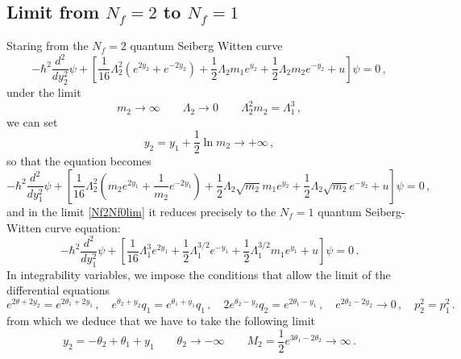 \documentclass[11pt,a4paper]{elsarticle}
\def \th {\theta}
\newcommand{\be}{\begin{equation}}
\newcommand{\ee}{\end{equation}}
\def\th{\theta}
\numberwithin{figure}{section}
\numberwithin{table}{section}
\begin{document}
\subsection{Limit from $N_f=2$ to $N_f=1$}

Staring from the $N_f=2$ quantum Seiberg Witten curve
\be 
-\hbar^2  \frac{d^2}{d y_2^2} \psi + \left[\frac{1}{16} \Lambda_2^2 (e^{2y_2} +e^{-2y_2} ) + \frac{1}{2}\Lambda_2 m_1 e^{y_2} + \frac{1}{2}\Lambda_2 m_2 e^{-y_2} +u\right] \psi = 0\,,
\ee
under the limit
\be  \label{Nf2Nf0lim}
m_2 \to \infty \qquad \Lambda_2 \to 0 \qquad\Lambda_2^2 m_2 = \Lambda_1^3  \,,
\ee
we can set
\be 
y_2 = y_1+\frac{1}{2} \ln m_2 \to + \infty\,,
\ee
so that the equation becomes
 \be 
-\hbar^2  \frac{d^2}{d y_1^2} \psi + \left[\frac{1}{16} \Lambda_2^2\left ( m_2 e^{2y_1} +\frac{1}{m_2}e^{-2y_1} \right) + \frac{1}{2}\Lambda_2 \sqrt{m_2}m_1  e^{y_2} + \frac{1}{2}\Lambda_2 \sqrt{m_2} e^{-y_2} +u\right] \psi = 0\,,
\ee
and in the limit \eqref{Nf2Nf0lim} it reduces precisely to the $N_f=1$ quantum Seiberg-Witten curve equation:
\be 
-\hbar^2  \frac{d^2}{d y_1^2} \psi + \left[\frac{1}{16} \Lambda_1^3 e^{2y_1} +\frac{1}{2}\Lambda_1^{3/2}e^{-y_1}  +\frac{1}{2} \Lambda_1^{3/2} m_1 e^{y_1} +u\right] \psi = 0 \,.
\ee
In integrability variables, we impose the conditions that allow the limit of the differential equations
\be 
e^{2 \th+2y_2} = e^{2 \th_1+2 y_1} \,, \quad e^{\th_2+y_2} q_1= e^{\th_1+ y_1} q_1\,,\quad
2e^{\th_2-y_2} q_2 = e^{2 \th_1-y_1} \,,\quad e^{2 \th_2 - 2 y_2} \to 0\,,\quad p_2^2 = p_1^2\,.
\ee 
from which we deduce that we have to take the following limit
\be 
y_2 = - \th_2 + \th_1 + y_1 \qquad \th_2 \to - \infty \qquad M_2 = \frac{1}{2} e^{3 \th_1-2 \th_2} \to \infty\,.
\ee


\newpage


\end{document}
